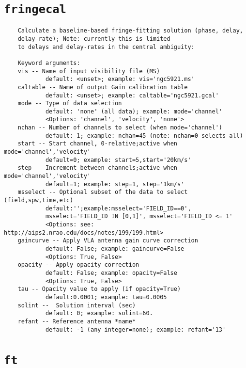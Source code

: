 \section{{\tt fringecal}}
\label{section:tasks.fringecal}

\small
\begin{verbatim}
    Calculate a baseline-based fringe-fitting solution (phase, delay,
    delay-rate); Note: currently this is limited  
    to delays and delay-rates in the central ambiguity:
    
    Keyword arguments:
    vis -- Name of input visibility file (MS)
            default: <unset>; example: vis='ngc5921.ms'
    caltable -- Name of output Gain calibration table
            default: <unset>; example: caltable='ngc5921.gcal'
    mode -- Type of data selection
            default: 'none' (all data); example: mode='channel'
            <Options: 'channel', 'velocity', 'none'>
    nchan -- Number of channels to select (when mode='channel')
            default: 1; example: nchan=45 (note: nchan=0 selects all)
    start -- Start channel, 0-relative;active when mode='channel','velocity'
            default=0; example: start=5,start='20km/s'
    step -- Increment between channels;active when mode='channel','velocity'
            default=1; example: step=1, step='1km/s'
    msselect -- Optional subset of the data to select (field,spw,time,etc)
            default:'';example:msselect='FIELD_ID==0', 
            msselect='FIELD_ID IN [0,1]', msselect='FIELD_ID <= 1'
            <Options: see: http://aips2.nrao.edu/docs/notes/199/199.html>
    gaincurve -- Apply VLA antenna gain curve correction
            default: False; example: gaincurve=False
            <Options: True, False>
    opacity -- Apply opacity correction
            default: False; example: opacity=False
            <Options: True, False>
    tau -- Opacity value to apply (if opacity=True)
            default:0.0001; example: tau=0.0005
    solint --  Solution interval (sec)
            default: 0; example: solint=60.
    refant -- Reference antenna *name*
            default: -1 (any integer=none); example: refant='13'
\end{verbatim}
\normalsize


\section{{\tt ft}}
\label{section:tasks.ft}

